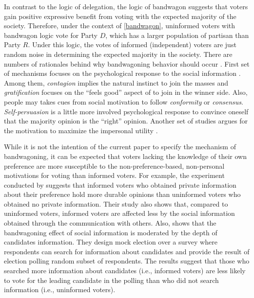 \documentclass[doc,natbib,12pt]{apa6}\usepackage[]{graphicx}\usepackage[]{color}
\begin{document}
    \par In contrast to the logic of delegation, the logic of bandwagon suggests that voters gain positive expressive benefit from voting with the expected majority of the society. Therefore, under the context of \autoref{bandwagon}, uninformed voters with bandwagon logic vote for Party $D$, which has a larger population of partisan than Party $R$. Under this logic, the votes of informed (independent) voters are just random noise in determining the expected majority in the society. There are numbers of rationales behind why bandwagoning behavior should occur \citep{Morton2015whmo, Tyran2016exev}. First set of mechanisms focuses on the psychological response to the social information \citep{Hardmeier2008thef}. Among them, \textit{contagion} implies the natural instinct to join the masses and \textit{gratification} focuses on the ``feels good'' aspect of to join in the winner side. Also, people may takes cues from social motivation to follow \textit{conformity} or \textit{consensus}. \textit{Self-persuasion} is a little more involved psychological response to convince oneself that the majority opinion is the ``right'' opinion. Another set of studies argues for the motivation to maximize the impersonal utility \citep{Coate2004grru, Feddersen2006thof, Feddersen2006thca}. 
    
    \par While it is not the intention of the current paper to specify the mechanism of bandwagoning, it can be expected that voters lacking the knowledge of their own preference are more susceptible to the non-preference-based, non-personal motivations for voting than informed voters. For example, the experiment conducted by \cite{Huckfeldt2014nobi} suggests that informed voters who obtained private information about their preference hold more durable opinions than uninformed voters who obtained no private information. Their study also shows that, compared to uninformed voters, informed voters are affected less by the social information obtained through the communication with others. Also, \cite{Roy2015anex} shows that the bandwagoning effect of social information is moderated by the depth of candidates information. They design mock election over a survey where respondents can search for information about candidates and provide the result of election polling random subset of respondents. The results suggest that those who searched more information about candidates (i.e., informed voters) are less likely to vote for the leading candidate in the polling than who did not search information (i.e., uninformed voters). 
    
\end{document}
